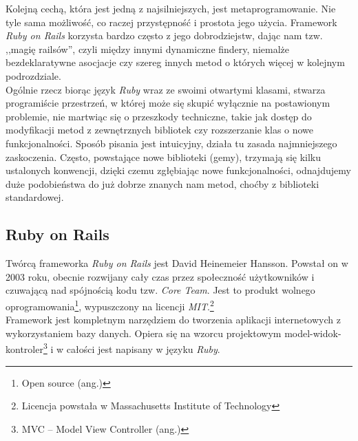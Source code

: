 \documentclass[a4paper,12pt]{article}
\begin{document}
Kolejną cechą, która jest jedną z najsilniejszych, jest metaprogramowanie. Nie tyle sama
możliwość, co raczej przystępność i prostota jego użycia. Framework \emph{Ruby on Rails}
korzysta bardzo często z jego dobrodziejstw, dając nam tzw. ,,magię railsów'', czyli
między innymi dynamiczne findery, niemalże bezdeklaratywne asocjacje czy szereg innych
metod o których więcej w kolejnym podrozdziale.\\
Ogólnie rzecz biorąc język \emph{Ruby} wraz ze swoimi otwartymi klasami, stwarza
programiście przestrzeń, w której może się skupić wyłącznie na postawionym problemie, nie
martwiąc się o przeszkody techniczne, takie jak dostęp do modyfikacji metod z zewnętrznych
bibliotek czy rozszerzanie klas o nowe funkcjonalności. Sposób pisania jest intuicyjny,
działa tu zasada najmniejszego zaskoczenia. Często, powstające nowe biblioteki (gemy), trzymają
się kilku ustalonych konwencji, dzięki czemu zgłębiając nowe funkcjonalności, odnajdujemy
duże podobieństwa do już dobrze znanych nam metod, choćby z biblioteki standardowej.

\clearpage
\subsection{Ruby on Rails}
Twórcą frameworka \emph{Ruby on Rails} jest David Heinemeier Hansson. Powstał on w 2003
roku, obecnie rozwijany cały czas przez społeczność użytkowników i czuwającą nad
spójnością kodu tzw. \emph{Core Team}. Jest to produkt wolnego
oprogramowania\footnote{Open source (ang.)}, wypuszczony na licencji
\emph{MIT}.\footnote{Licencja powstała w Massachusetts Institute of Technology}\\
Framework jest kompletnym narzędziem do tworzenia aplikacji internetowych z wykorzystaniem
bazy danych. Opiera się na wzorcu projektowym model-widok-kontroler\footnote{MVC -- Model View
Controller (ang.)} i w całości jest napisany w języku \emph{Ruby}.
\end{document}
